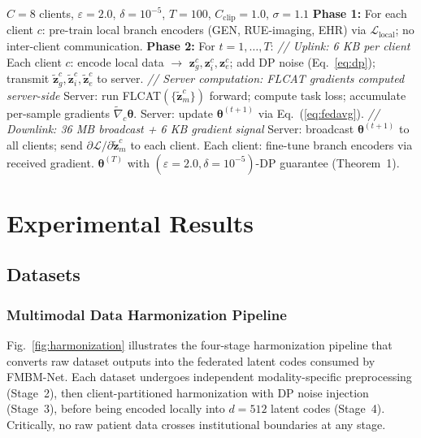 \documentclass{ieeeaccess}
\begin{document}
\begin{algorithm}
\caption{FMBM-Net Two-Phase Federated Training (detailed)}
\label{alg:train}
\begin{algorithmic}[1]
\REQUIRE $C\!=\!8$ clients, $\varepsilon\!=\!2.0$, $\delta\!=\!10^{-5}$,
         $T\!=\!100$, $C_{\mathrm{clip}}\!=\!1.0$, $\sigma\!=\!1.1$
\STATE \textbf{Phase 1:} For each client $c$: pre-train local branch
       encoders (GEN, RUE-imaging, EHR) via $\mathcal{L}_{\mathrm{local}}$;
       no inter-client communication.
\STATE \textbf{Phase 2:} For $t = 1,\ldots,T$:
\STATE \quad \textit{// Uplink: 6 KB per client}
\STATE \quad Each client $c$: encode local data $\to$ $\mathbf{z}_g^c,
       \mathbf{z}_i^c, \mathbf{z}_e^c$; add DP noise (Eq.~\ref{eq:dp});
       transmit $\tilde{\mathbf{z}}_g^c, \tilde{\mathbf{z}}_i^c,
       \tilde{\mathbf{z}}_e^c$ to server.
\STATE \quad \textit{// Server computation: FLCAT gradients computed server-side}
\STATE \quad Server: run FLCAT$(\{\tilde{\mathbf{z}}_m^c\})$ forward;
       compute task loss; accumulate per-sample gradients
       $\tilde{\nabla}_c\boldsymbol{\theta}$.
\STATE \quad Server: update $\boldsymbol{\theta}^{(t+1)}$ via
       Eq.~(\ref{eq:fedavg}).
\STATE \quad \textit{// Downlink: 36 MB broadcast + 6 KB gradient signal}
\STATE \quad Server: broadcast $\boldsymbol{\theta}^{(t+1)}$ to all clients;
       send $\partial\mathcal{L}/\partial\tilde{\mathbf{z}}_m^c$ to each client.
\STATE \quad Each client: fine-tune branch encoders via received gradient.
\ENSURE $\boldsymbol{\theta}^{(T)}$ with $(\varepsilon\!=\!2.0,
        \delta\!=\!10^{-5})$-DP guarantee (Theorem~1).
\end{algorithmic}
\end{algorithm}

\section{Experimental Results}
\label{sec:experiments}

\subsection{Datasets}

\subsubsection{Multimodal Data Harmonization Pipeline}
Fig.~\ref{fig:harmonization} illustrates the four-stage harmonization
pipeline that converts raw dataset outputs into the federated latent codes
consumed by FMBM-Net. Each dataset undergoes independent modality-specific
preprocessing (Stage~2), then client-partitioned harmonization with DP noise
injection (Stage~3), before being encoded locally into $d\!=\!512$ latent
codes (Stage~4). Critically, no raw patient data crosses institutional
boundaries at any stage.
\end{document}

